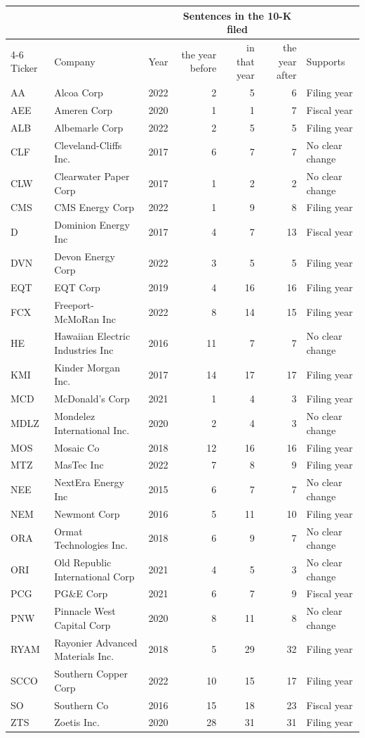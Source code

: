 \begin{tabular}{llrrrrl}
\toprule
 & & & \multicolumn{3}{c}{Sentences in the 10-K filed} & \\
\cmidrule(lr){4-6}
Ticker & Company & Year & the year before & in that year & the year after & Supports \\
\midrule
AA & Alcoa Corp & 2022 & 2 & 5 & 6 & Filing year \\
AEE & Ameren Corp & 2020 & 1 & 1 & 7 & Fiscal year \\
ALB & Albemarle Corp & 2022 & 2 & 5 & 5 & Filing year \\
CLF & Cleveland-Cliffs Inc. & 2017 & 6 & 7 & 7 & No clear change \\
CLW & Clearwater Paper Corp & 2017 & 1 & 2 & 2 & No clear change \\
CMS & CMS Energy Corp & 2022 & 1 & 9 & 8 & Filing year \\
D & Dominion Energy Inc & 2017 & 4 & 7 & 13 & Fiscal year \\
DVN & Devon Energy Corp & 2022 & 3 & 5 & 5 & Filing year \\
EQT & EQT Corp & 2019 & 4 & 16 & 16 & Filing year \\
FCX & Freeport-McMoRan Inc & 2022 & 8 & 14 & 15 & Filing year \\
HE & Hawaiian Electric Industries Inc & 2016 & 11 & 7 & 7 & No clear change \\
KMI & Kinder Morgan Inc. & 2017 & 14 & 17 & 17 & Filing year \\
MCD & McDonald's Corp & 2021 & 1 & 4 & 3 & Filing year \\
MDLZ & Mondelez International Inc. & 2020 & 2 & 4 & 3 & No clear change \\
MOS & Mosaic Co & 2018 & 12 & 16 & 16 & Filing year \\
MTZ & MasTec Inc & 2022 & 7 & 8 & 9 & Filing year \\
NEE & NextEra Energy Inc & 2015 & 6 & 7 & 7 & No clear change \\
NEM & Newmont Corp & 2016 & 5 & 11 & 10 & Filing year \\
ORA & Ormat Technologies Inc. & 2018 & 6 & 9 & 7 & No clear change \\
ORI & Old Republic International Corp & 2021 & 4 & 5 & 3 & No clear change \\
PCG & PG\&E Corp & 2021 & 6 & 7 & 9 & Fiscal year \\
PNW & Pinnacle West Capital Corp & 2020 & 8 & 11 & 8 & No clear change \\
RYAM & Rayonier Advanced Materials Inc. & 2018 & 5 & 29 & 32 & Filing year \\
SCCO & Southern Copper Corp & 2022 & 10 & 15 & 17 & Filing year \\
SO & Southern Co & 2016 & 15 & 18 & 23 & Fiscal year \\
ZTS & Zoetis Inc. & 2020 & 28 & 31 & 31 & Filing year \\
\bottomrule
\end{tabular}
